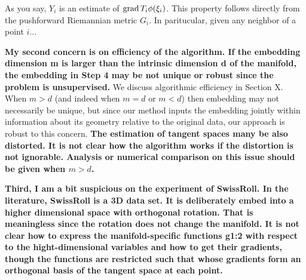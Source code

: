 \documentclass[draft]{article}
\begin{document}
As you say, $Y_i$ is an estimate of $\operatorname{grad} T_i \phi (\xi_i)$. This property follows directly from the pushforward Riemannian metric $G_i$.  In paritucular, given any neighbor of a point $i$...

\textbf{
My second concern is on efficiency of the algorithm. If the embedding dimension m is larger than the intrinsic dimension d of the manifold, the embedding in Step 4 may be not unique or robust since the problem is unsupervised.
}
We discuss algorithmic efficiency in Section X.  When $m > d$ (and indeed when $m = d$ or $m <d$) then embedding may not necessarily be unique, but since our method inputs the embedding jointly within information about its geometry relative to the original data, our approach is robust to this concern. 
\textbf{
The estimation of tangent spaces many be also distorted. It is not clear how the algorithm works if the distortion is not ignorable. Analysis or numerical comparison on this issue should be given when $m > d$.}







\textbf{
Third, I am a bit suspicious on the experiment of SwissRoll. In the literature, SwissRoll is a 3D data set. It is deliberately embed into a higher dimensional space with orthogonal rotation. That is meaningless since the rotation does not change the manifold. It is not clear how to express the manifold-specific functions g1:2 with respect to the hight-dimensional variables and how to get their gradients, though the functions are restricted such that whose gradients form an orthogonal basis of the tangent space at each point.}
\end{document}
